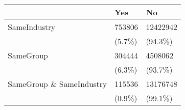 \begin{tabular}{lll}
\toprule
{} &     Yes &        No \\
\midrule
SameIndustry             &  753806 &  12422942 \\
                         &  (5.7\%) &   (94.3\%) \\
SameGroup                &  304444 &   4508062 \\
                         &  (6.3\%) &   (93.7\%) \\
SameGroup \& SameIndustry &  115536 &  13176748 \\
                         &  (0.9\%) &   (99.1\%) \\
\bottomrule
\end{tabular}
